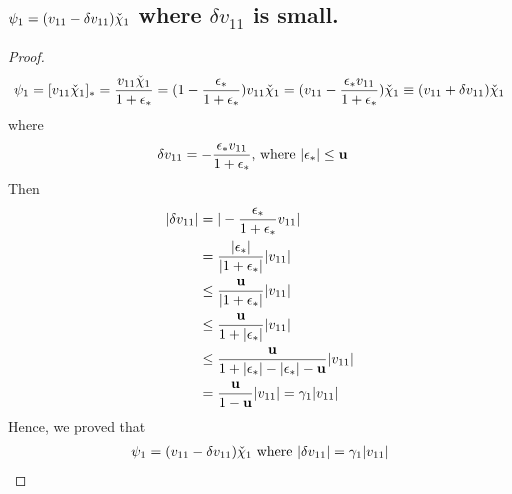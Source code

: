 \documentclass[11pt,a4paper]{article}
\begin{document}
\subsection{$\psi_1 = (v_{11} - \delta v_{11}) \check{\chi}_1$ where $\delta v_{11}$ is small.}
\begin{proof}
\begin{align}
    \psi_1 
    = [v_{11} \check{\chi}_1]_* 
    = \frac{v_{11} \check{\chi}_1}{1+\epsilon_*}
    = (1 - \frac{\epsilon_*}{1+\epsilon_*}) v_{11}\check{\chi}_1
    = (v_{11} - \frac{\epsilon_*v_{11}}{1+\epsilon_*}) \check{\chi}_1
    \equiv (v_{11} + \delta v_{11}) \check{\chi}_1
\end{align}
where 
\begin{align}
    \delta v_{11}  &= - \frac{\epsilon_*v_{11}}{1+\epsilon_*} 
    \text{, where } |\epsilon_*| \leq \mathbf{u}
\end{align}
Then 
\begin{align}
    |\delta v_{11}| &= |- \frac{\epsilon_*}{1+\epsilon_*} v_{11}|  \\
    &= \frac{|\epsilon_*|}{|1+\epsilon_*|} | v_{11}| \\
    &\leq \frac{\mathbf{u}}{|1+\epsilon_*|} | v_{11}| \\
    &\leq \frac{\mathbf{u}}{1+|\epsilon_*|} | v_{11}| \\
    &\leq \frac{\mathbf{u}}{1+|\epsilon_*| -|\epsilon_*| - \mathbf{u}} | v_{11}| \\
    &= \frac{\mathbf{u}}{1 - \mathbf{u}} | v_{11}| 
    = \gamma_1 | v_{11}| 
\end{align}
Hence, we proved that 
\begin{align}
    \psi_1 = (v_{11} - \delta v_{11}) \check{\chi}_1 \text{ where }
|\delta v_{11}| = \gamma_1 | v_{11}| 
\end{align}
\end{proof}
\end{document}
